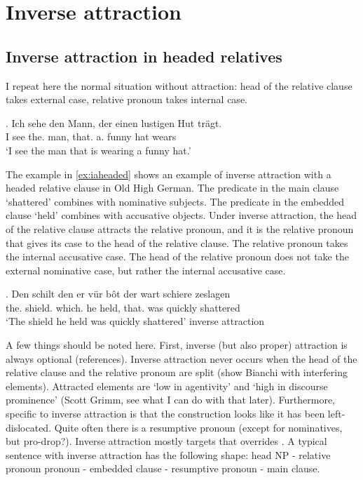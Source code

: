 \section{Inverse attraction}\label{sec:invatt}

\subsection{Inverse attraction in headed relatives}\label{sec:invattheaded}

I repeat here the normal situation without attraction: head of the relative clause takes external case, relative pronoun takes internal case.

\exg. Ich sehe den Mann, der einen lustigen Hut trägt.\\
I see the. man, that. a. funny hat wears\\
`I see the man that is wearing a funny hat.'

The example in \ref{ex:iaheaded} shows an example of inverse attraction with a headed relative clause in Old High German. The predicate in the main clause  `shattered' combines with nominative subjects. The predicate in the embedded clause  `held' combines with accusative objects. Under inverse attraction, the head of the relative clause attracts the relative pronoun, and it is the relative pronoun that gives its case to the head of the relative clause. The relative pronoun takes the internal accusative case. The head of the relative pronoun does not take the external nominative case, but rather the internal accusative case.

\exg. Den schilt den er {vür bôt} der wart schiere zeslagen\\
the. shield. which. he held, that. was quickly shattered\\
`The shield he held was quickly shattered' \label{ex:iaheaded}\hfill inverse attraction

A few things should be noted here. First, inverse (but also proper) attraction is always optional (references). Inverse attraction never occurs when the head of the relative clause and the relative pronoun are split (show Bianchi with interfering elements). Attracted elements are `low in agentivity' and `high in discourse prominence' (Scott Grimm, see what I can do with that later). Furthermore, specific to inverse attraction is that the construction looks like it has been left-dislocated. Quite often there is a resumptive pronoun (except for nominatives, but pro-drop?). Inverse attraction mostly targets  that overrides . A typical sentence with inverse attraction has the following shape: head NP - relative pronoun pronoun - embedded clause - resumptive pronoun - main clause.

